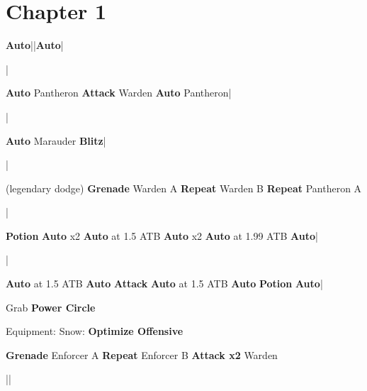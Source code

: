 \section{Chapter 1}

\begin{mainlist}
	\item {}
	\item {} \textbf{Auto}|\skip|\textbf{Auto}|\skip
	\item \skip|\skip
	\item {} \textbf{Auto} Pantheron \to \textbf{Attack} Warden \to \textbf{Auto} Pantheron|\skip
	\item \skip|\skip
	\item {} \textbf{Auto} Marauder \to \textbf{Blitz}|
	\item \skip|\skip
	\item {} (legendary dodge) \textbf{Grenade} Warden A \to \textbf{Repeat} Warden B \to \textbf{Repeat} Pantheron A
	\item \skip|\skip
	\item {} \textbf{Potion} \to \textbf{Auto} x2 \to \textbf{Auto} at 1.5 ATB \to \textbf{Auto} x2 \to \textbf{Auto} at 1.99 ATB \to \textbf{Auto}|\skip
	\item \save|\skip
	\item {} \textbf{Auto} at 1.5 ATB \to \textbf{Auto} \to \textbf{Attack} \to \textbf{Auto} at 1.5 ATB \to \textbf{Auto} \to \textbf{Potion} \to \textbf{Auto}|
	\item Grab \textbf{Power Circle}
\end{mainlist}

\begin{menu}
	\item Equipment: Snow: \textbf{Optimize Offensive}
\end{menu}

\begin{mainlist}
	\item \skip
	\item {} \textbf{Grenade} Enforcer A \to \textbf{Repeat} Enforcer B \to \textbf{Attack x2} Warden
	\item {}|\skip|\save
\end{mainlist}
